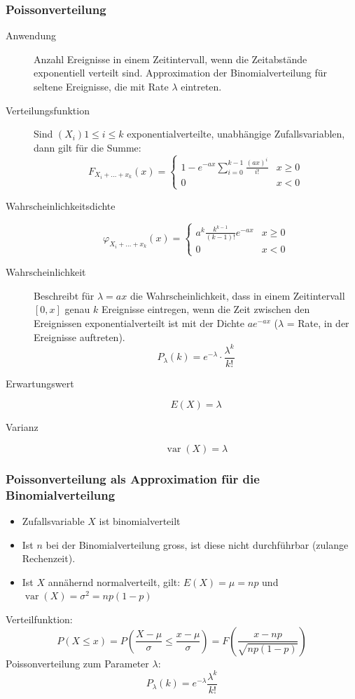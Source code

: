 \subsubsection{Poissonverteilung}
\begin{description}
  \item[Anwendung] Anzahl Ereignisse in einem Zeitintervall, wenn die
    Zeitabstände exponentiell verteilt sind. Approximation der
    Binomialverteilung für seltene Ereignisse, die mit Rate $\lambda$
    eintreten.
  \item[Verteilungsfunktion] Sind $(X_i)1 \leq i \leq k$
    exponentialverteilte, unabhängige Zufallsvariablen, dann gilt für die
    Summe:
  \[F_{X_i+\dots+x_k}(x) = \begin{cases}1 - e^{-ax} \sum_{i=0}^{k-1}
  \frac{(ax)^i}{i!} & x \geq 0 \\ 0 & x < 0\end{cases}\]
  \item[Wahrscheinlichkeitsdichte]
  \[\varphi_{X_i+\dots+x_k}(x) = \begin{cases}a^k \frac{k^{k-1}}{(k-1)!}
  e^{-ax} & x \geq 0 \\ 0 & x < 0\end{cases}\]
  \item[Wahrscheinlichkeit] Beschreibt für $\lambda = ax$ die
    Wahrscheinlichkeit, dass in einem Zeitintervall $[0, x]$ genau $k$
    Ereignisse eintregen, wenn die Zeit zwischen den Ereignissen
    exponentialverteilt ist mit der Dichte $ae^{-ax}$ ($\lambda$ = Rate,
    in der Ereignisse auftreten).
    \[P_\lambda(k) = e^{-\lambda} \cdot \frac{\lambda^k}{k!}\]
  \item[Erwartungswert] \[E(X) = \lambda\]
  \item[Varianz] \[\operatorname{var}(X) = \lambda\]
\end{description}

\subsubsection{Poissonverteilung als Approximation für die
Binomialverteilung}
\begin{itemize}
  \item Zufallsvariable $X$ ist binomialverteilt
  \item Ist $n$ bei der Binomialverteilung gross, ist diese nicht
    durchführbar (zulange Rechenzeit).
  \item Ist $X$ annähernd normalverteilt, gilt:
    $E(X) = \mu = np$ und $\operatorname{var}(X) = \sigma^2 = np(1-p)$
\end{itemize}
Verteilfunktion:
\[ P(X \le x) = P\left(\frac{X - \mu}{\sigma} \le
  \frac{x-\mu}{\sigma}\right) = F\left(\frac{x-np}{\sqrt{np(1-p)}}\right)\]
Poissonverteilung zum Parameter $\lambda$:
\[ P_{\lambda}(k) = e^{-\lambda} \frac{\lambda^k}{k!}\]

